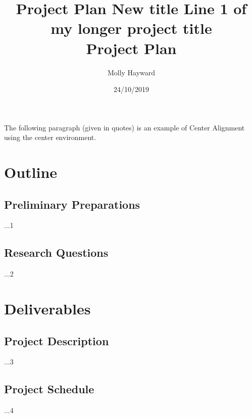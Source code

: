 \documentclass[12pt,a4paper]{article}
\title{Project Plan \large \newline 
New title}
\title{
	Line 1 of my longer project title \\
	\large Project Plan}
\author{Molly Hayward}
\date{24/10/2019}
\begin{document}
\maketitle

\begin{center}
	The following paragraph (given in quotes) is an example of Center Alignment using the center environment. 
\end{center}


\section{Outline}

\subsection{Preliminary Preparations}
...1


\subsection{Research Questions}
...2


\newpage

\section{Deliverables}

\subsection{Project Description}
...3

\subsection{Project Schedule}
...4 

\newpage
\end{document}

